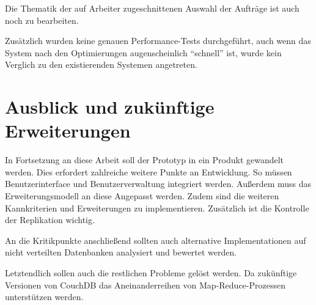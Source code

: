 Die Thematik der auf Arbeiter zugeschnittenen Auswahl der Aufträge ist auch noch zu bearbeiten.

Zusätzlich wurden keine genauen Performance-Tests durchgeführt,
auch wenn das System nach den Optimierungen augenscheinlich ``schnell'' ist,
wurde kein Verglich zu den existierenden Systemen angetreten.





\section{Ausblick und zukünftige Erweiterungen}
\label{sec:fazit:ausblick}
In Fortsetzung an diese Arbeit soll der Prototyp in ein Produkt gewandelt werden.
Dies erfordert zahlreiche weitere Punkte an Entwicklung.
So müssen Benutzerinterface und Benutzerverwaltung integriert werden.
Außerdem muss das Erweiterungsmodell an diese Angepasst werden.
Zudem sind die weiteren Kannkriterien und Erweiterungen zu implementieren.
Zusätzlich ist die Kontrolle der Replikation wichtig.

An die Kritikpunkte anschließend sollten auch alternative Implementationen auf nicht verteilten Datenbanken analysiert und bewertet werden.

Letztendlich sollen auch die restlichen Probleme gelöst werden.
Da zukünftige Versionen von CouchDB das Aneinanderreihen von Map-Reduce-Prozessen unterstützen werden.
